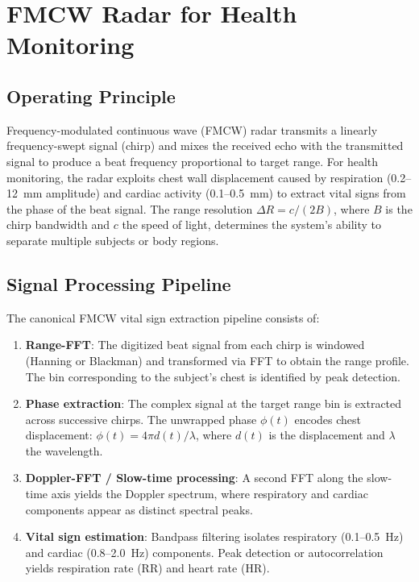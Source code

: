 \documentclass[journal,twoside]{IEEEtran}
\begin{document}
\section{FMCW Radar for Health Monitoring}

\subsection{Operating Principle}
Frequency-modulated continuous wave (FMCW) radar transmits a linearly frequency-swept signal (chirp) and mixes the received echo with the transmitted signal to produce a beat frequency proportional to target range. For health monitoring, the radar exploits chest wall displacement caused by respiration (0.2--12~mm amplitude) and cardiac activity (0.1--0.5~mm) to extract vital signs from the phase of the beat signal. The range resolution $\Delta R = c/(2B)$, where $B$ is the chirp bandwidth and $c$ the speed of light, determines the system's ability to separate multiple subjects or body regions.

\subsection{Signal Processing Pipeline}
The canonical FMCW vital sign extraction pipeline consists of:
\begin{enumerate}
\item \textbf{Range-FFT}: The digitized beat signal from each chirp is windowed (Hanning or Blackman) and transformed via FFT to obtain the range profile. The bin corresponding to the subject's chest is identified by peak detection.
\item \textbf{Phase extraction}: The complex signal at the target range bin is extracted across successive chirps. The unwrapped phase $\phi(t)$ encodes chest displacement: $\phi(t) = 4\pi d(t)/\lambda$, where $d(t)$ is the displacement and $\lambda$ the wavelength.
\item \textbf{Doppler-FFT / Slow-time processing}: A second FFT along the slow-time axis yields the Doppler spectrum, where respiratory and cardiac components appear as distinct spectral peaks.
\item \textbf{Vital sign estimation}: Bandpass filtering isolates respiratory (0.1--0.5~Hz) and cardiac (0.8--2.0~Hz) components. Peak detection or autocorrelation yields respiration rate (RR) and heart rate (HR).
\end{enumerate}
\end{document}
